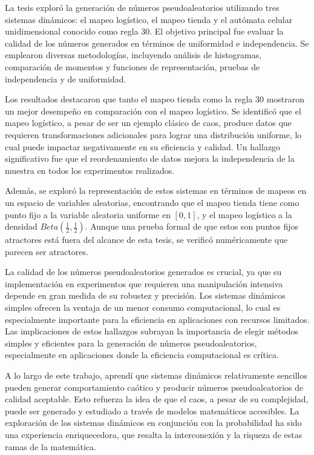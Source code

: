 \documentclass[../Main.tex]{subfiles}
\begin{document}
La tesis exploró la generación de números pseudoaleatorios utilizando tres sistemas dinámicos: el mapeo logístico, el mapeo tienda y el autómata celular unidimensional conocido como regla 30. El objetivo principal fue evaluar la calidad de los números generados en términos de uniformidad e independencia. Se emplearon diversas metodologías, incluyendo análisis de histogramas, comparación de momentos y funciones de representación, pruebas de independencia y de uniformidad.

Los resultados destacaron que tanto el mapeo tienda como la regla 30 mostraron un mejor desempeño en comparación con el mapeo logístico. Se identificó que el mapeo logístico, a pesar de ser un ejemplo clásico de caos, produce datos que requieren transformaciones adicionales para lograr una distribución uniforme, lo cual puede impactar negativamente en su eficiencia y calidad. Un hallazgo significativo fue que el reordenamiento de datos mejora la independencia de la muestra en todos los experimentos realizados. 

Además, se exploró la representación de estos sistemas en términos de mapeos en un espacio de variables aleatorias, encontrando que el mapeo tienda tiene como punto fijo a la variable aleatoria uniforme en $[0,1]$, y el mapeo logístico a la densidad $Beta(\frac{1}{2},\frac{1}{2})$. Aunque una prueba formal de que estos son puntos fijos atractores está fuera del alcance de esta tesis, se verificó numéricamente que parecen ser atractores.

La calidad de los números pseudoaleatorios generados es crucial, ya que su implementación en experimentos que requieren una manipulación intensiva depende en gran medida de su robustez y precisión. Los sistemas dinámicos simples ofrecen la ventaja de un menor consumo computacional, lo cual es especialmente importante para la eficiencia en aplicaciones con recursos limitados. Las implicaciones de estos hallazgos subrayan la importancia de elegir métodos simples y eficientes para la generación de números pseudoaleatorios, especialmente en aplicaciones donde la eficiencia computacional es crítica. 

A lo largo de este trabajo, aprendí que sistemas dinámicos relativamente sencillos pueden generar comportamiento caótico y producir números pseudoaleatorios de calidad aceptable. Esto refuerza la idea de que el caos, a pesar de su complejidad, puede ser generado y estudiado a través de modelos matemáticos accesibles. La exploración de los sistemas dinámicos en conjunción con la probabilidad ha sido una experiencia enriquecedora, que resalta la interconexión y la riqueza de estas ramas de la matemática.
\end{document}
